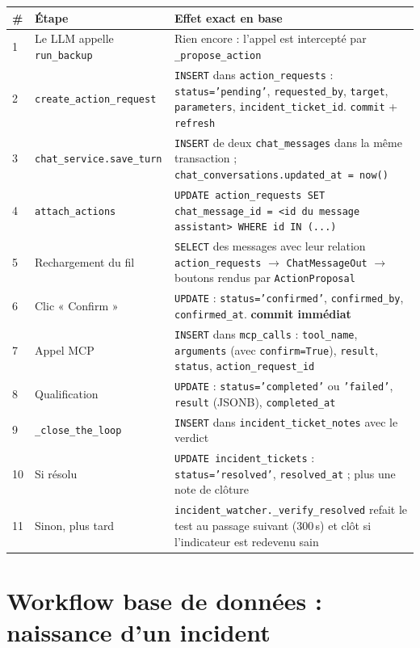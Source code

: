\documentclass[11pt,a4paper]{report}
\newcommand{\fn}[1]{\texttt{\small\textcolor{oasisviolet}{#1}}}
\newcommand{\cls}[1]{\texttt{\small\textcolor{oasisblue}{#1}}}
\newcommand{\tbl}[1]{\texttt{\small\textcolor{oasisamber}{#1}}}
\newcommand{\arrowto}{\ensuremath{\rightarrow}}
\begin{document}
\begin{longtable}{@{}p{0.7cm}p{4.4cm}p{9.6cm}@{}}
\toprule
\textbf{\#} & \textbf{Étape} & \textbf{Effet exact en base}\\
\midrule
\endhead
1 & Le LLM appelle \fn{run\_backup} & Rien encore : l'appel est intercepté par \fn{\_propose\_action}\\
2 & \fn{create\_action\_request} & \texttt{INSERT} dans \tbl{action\_requests} : \texttt{status='pending'}, \texttt{requested\_by}, \texttt{target}, \texttt{parameters}, \texttt{incident\_ticket\_id}. \texttt{commit} + \texttt{refresh}\\
3 & \fn{chat\_service.save\_turn} & \texttt{INSERT} de deux \tbl{chat\_messages} dans la même transaction ; \texttt{chat\_conversations.updated\_at = now()}\\
4 & \fn{attach\_actions} & \texttt{UPDATE action\_requests SET chat\_message\_id = <id du message assistant> WHERE id IN (...)}\\
5 & Rechargement du fil & \texttt{SELECT} des messages avec leur relation \texttt{action\_requests} \arrowto{} \cls{ChatMessageOut} \arrowto{} boutons rendus par \cls{ActionProposal}\\
6 & Clic « Confirm » & \texttt{UPDATE} : \texttt{status='confirmed'}, \texttt{confirmed\_by}, \texttt{confirmed\_at}. \textbf{commit immédiat}\\
7 & Appel MCP & \texttt{INSERT} dans \tbl{mcp\_calls} : \texttt{tool\_name}, \texttt{arguments} (avec \texttt{confirm=True}), \texttt{result}, \texttt{status}, \texttt{action\_request\_id}\\
8 & Qualification & \texttt{UPDATE} : \texttt{status='completed'} ou \texttt{'failed'}, \texttt{result} (JSONB), \texttt{completed\_at}\\
9 & \fn{\_close\_the\_loop} & \texttt{INSERT} dans \tbl{incident\_ticket\_notes} avec le verdict\\
10 & Si résolu & \texttt{UPDATE incident\_tickets} : \texttt{status='resolved'}, \texttt{resolved\_at} ; plus une note de clôture\\
11 & Sinon, plus tard & \fn{incident\_watcher.\_verify\_resolved} refait le test au passage suivant (300\,s) et clôt si l'indicateur est redevenu sain\\
\bottomrule
\end{longtable}

\section{Workflow base de données : naissance d'un incident}
\end{document}
